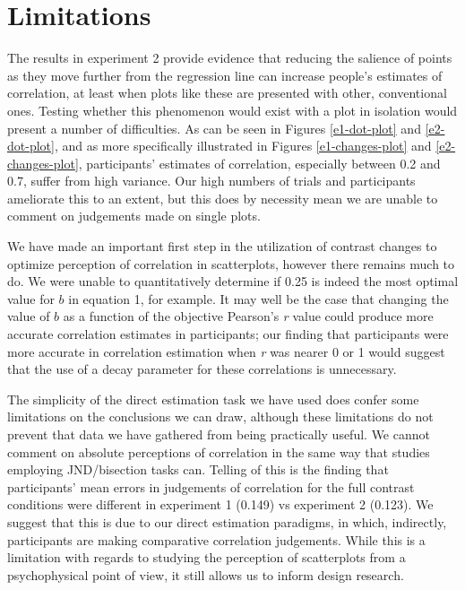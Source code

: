\documentclass[preprint, 3p,
authoryear]{elsarticle} %
\begin{document}
\hypertarget{limitations}{%
\section{Limitations}\label{limitations}}

The results in experiment 2 provide evidence that reducing the salience
of points as they move further from the regression line can increase
people's estimates of correlation, at least when plots like these are
presented with other, conventional ones. Testing whether this phenomenon
would exist with a plot in isolation would present a number of
difficulties. As can be seen in Figures \ref{e1-dot-plot} and
\ref{e2-dot-plot}, and as more specifically illustrated in Figures
\ref{e1-changes-plot} and \ref{e2-changes-plot}, participants' estimates
of correlation, especially between 0.2 and 0.7, suffer from high
variance. Our high numbers of trials and participants ameliorate this to
an extent, but this does by necessity mean we are unable to comment on
judgements made on single plots.

We have made an important first step in the utilization of contrast
changes to optimize perception of correlation in scatterplots, however
there remains much to do. We were unable to quantitatively determine if
0.25 is indeed the most optimal value for \(b\) in equation 1, for
example. It may well be the case that changing the value of \(b\) as a
function of the objective Pearson's \emph{r} value could produce more
accurate correlation estimates in participants; our finding that
participants were more accurate in correlation estimation when \emph{r}
was nearer 0 or 1 would suggest that the use of a decay parameter for
these correlations is unnecessary.

The simplicity of the direct estimation task we have used does confer
some limitations on the conclusions we can draw, although these
limitations do not prevent that data we have gathered from being
practically useful. We cannot comment on absolute perceptions of
correlation in the same way that studies employing JND/bisection tasks
can. Telling of this is the finding that participants' mean errors in
judgements of correlation for the full contrast conditions were
different in experiment 1 (0.149) vs experiment 2 (0.123). We suggest
that this is due to our direct estimation paradigms, in which,
indirectly, participants are making comparative correlation judgements.
While this is a limitation with regards to studying the perception of
scatterplots from a psychophysical point of view, it still allows us to
inform design research.
\end{document}
